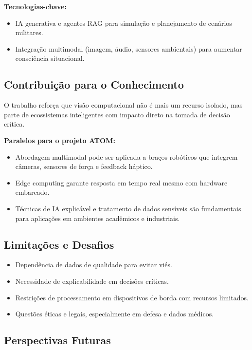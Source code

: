 \documentclass{article}
\begin{document}
\textbf{Tecnologias-chave:}
\begin{itemize}
    \item IA generativa e agentes RAG para simulação e planejamento de cenários militares.
    \item Integração multimodal (imagem, áudio, sensores ambientais) para aumentar consciência situacional.
\end{itemize}

\subsection*{Contribuição para o Conhecimento}

O trabalho reforça que visão computacional não é mais um recurso isolado, mas parte de ecossistemas inteligentes com impacto direto na tomada de decisão crítica.

\textbf{Paralelos para o projeto ATOM:}
\begin{itemize}
    \item Abordagem multimodal pode ser aplicada a braços robóticos que integrem câmeras, sensores de força e feedback háptico.
    \item Edge computing garante resposta em tempo real mesmo com hardware embarcado.
    \item Técnicas de IA explicável e tratamento de dados sensíveis são fundamentais para aplicações em ambientes acadêmicos e industriais.
\end{itemize}

\subsection*{Limitações e Desafios}

\begin{itemize}
    \item Dependência de dados de qualidade para evitar viés.
    \item Necessidade de explicabilidade em decisões críticas.
    \item Restrições de processamento em dispositivos de borda com recursos limitados.
    \item Questões éticas e legais, especialmente em defesa e dados médicos.
\end{itemize}

\subsection*{Perspectivas Futuras}
\end{document}
